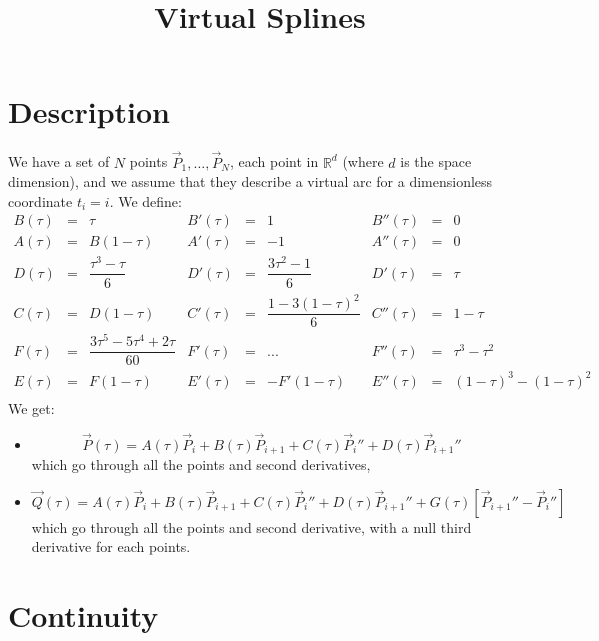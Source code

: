 \documentclass[aps,12pt]{revtex4}
\begin{document}
\title{Virtual Splines}
\maketitle
	

\section{Description}
We have a set of $N$ points $\vec{P}_1,\ldots,\vec{P}_N$, each point in $\mathbb{R}^d$ (where $d$ is the space dimension), and we assume
that they describe a virtual arc for a dimensionless coordinate $t_i=i$.
We define:
\begin{equation}
 	\begin{array}{rcl|rcl|rcl}
	B(\tau) & = & \tau  & B'(\tau) & = & 1 & B''(\tau) & = & 0\\
	A(\tau) & = & B(1-\tau) & A'(\tau) & = & -1 & A''(\tau) & = & 0\\
	D(\tau) & = & \dfrac{\tau^3-\tau}{6} & D'(\tau) & = & \dfrac{3\tau^2-1}{6}& D'(\tau) & = & \tau\\
	C(\tau) & = & D(1-\tau) & C'(\tau) & = & \dfrac{1-3(1-\tau)^2}{6} & C''(\tau) & = & 1-\tau\\
	F(\tau) & = & \dfrac{3\tau^5-5\tau^4+2\tau}{60} & F'(\tau) & = & ...& F''(\tau) & = & \tau^3-\tau^2\\
	E(\tau) & = & F(1-\tau) & E'(\tau) & = & -F'(1-\tau) & E''(\tau) & = & (1-\tau)^3-(1-\tau)^2\\
	\end{array}
 \end{equation}
 We get:
\begin{itemize}
\item
\begin{equation}
\vec{P}(\tau) = A(\tau)\vec{P}_i + B(\tau) \vec{P}_{i+1} + C(\tau)\vec{P}_{i}'' + D(\tau) \vec{P}_{i+1}''
\end{equation}
which go through all the points and second derivatives,
\item
\begin{equation}
\vec{Q}(\tau) = A(\tau)\vec{P}_i + B(\tau) \vec{P}_{i+1} + C(\tau)\vec{P}_{i}'' + D(\tau) \vec{P}_{i+1}'' + G(\tau) \left[ \vec{P}_{i+1}'' - \vec{P}_{i}''\right]
\end{equation}
which go through all the points and second derivative, with a null third derivative for each points.
\end{itemize}

\section{Continuity}
\end{document}
